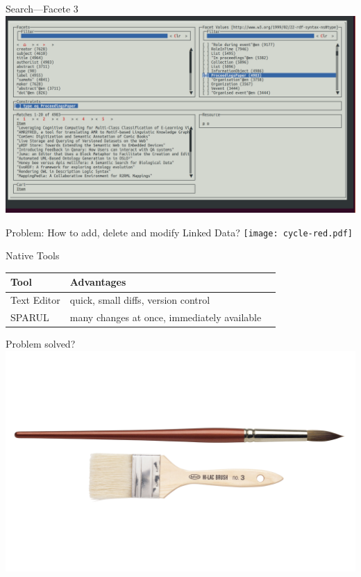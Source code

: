 \documentclass[aspectratio=1610]{beamer}
\begin{document}
\begin{frame}{Search---Facete 3}
\centering
\includegraphics[width=\textwidth]{img/facete3.png}
\end{frame}

\begin{frame}{Problem: How to add, delete and modify Linked Data?}
\centering
\texttt{[image: cycle-red.pdf]}
\end{frame}

\begin{frame}{Native Tools}
\centering
\begin{tabulary}{\textwidth}{lLL}
\toprule
Tool		&Advantages\\					
\midrule
Text Editor	&quick, small diffs, version control\\
SPARUL		&many changes at once, immediately available\\
\bottomrule
\end{tabulary}
\end{frame}

\begin{frame}{Problem solved?}
\centering
\includegraphics[width=0.9\paperwidth]{img/texteditorsparul.png}
\end{frame}
\end{document}

